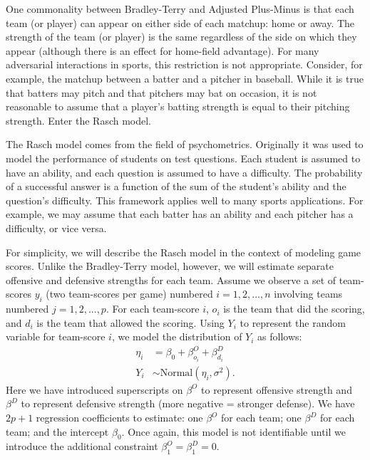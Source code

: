 \documentclass{article}
\begin{document}
  One commonality between Bradley-Terry and Adjusted Plus-Minus is that each team (or player) can appear on either side of each matchup: home or away. The strength of the team (or player) is the same regardless of the side on which they appear (although there is an effect for home-field advantage). For many adversarial interactions in sports, this restriction is not appropriate. Consider, for example, the matchup between a batter and a pitcher in baseball. While it is true that batters may pitch and that pitchers may bat on occasion, it is not reasonable to assume that a player's batting strength is equal to their pitching strength. Enter the Rasch model.

  The Rasch model comes from the field of psychometrics. Originally it was used to model the performance of students on test questions. Each student is assumed to have an ability, and each question is assumed to have a difficulty. The probability of a successful answer is a function of the sum of the student's ability and the question's difficulty. This framework applies well to many sports applications. For example, we may assume that each batter has an ability and each pitcher has a difficulty, or vice versa.

  For simplicity, we will describe the Rasch model in the context of modeling game scores. Unlike the Bradley-Terry model, however, we will estimate separate offensive and defensive strengths for each team. Assume we observe a set of team-scores $y_i$ (two team-scores per game) numbered $i = 1, 2, ..., n$ involving teams numbered $j = 1, 2, ..., p$. For each team-score $i$, $o_i$ is the team that did the scoring, and $d_i$ is the team that allowed the scoring. Using $Y_i$ to represent the random variable for team-score $i$, we model the distribution of $Y_i$ as follows:
  \begin{equation*}
    \begin{split}
      \eta_{i} &= \beta_0 + \beta^O_{o_i} + \beta^D_{d_i}\\
      Y_i &\sim \mbox{Normal}(\eta_i, \sigma^2).
    \end{split}
  \end{equation*}
  Here we have introduced superscripts on $\beta^O$ to represent offensive strength and $\beta^D$ to represent defensive strength (more negative = stronger defense). We have $2p + 1$ regression coefficients to estimate: one $\beta^O$ for each team; one $\beta^D$ for each team; and the intercept $\beta_0$. Once again, this model is not identifiable until we introduce the additional constraint $\beta^O_1 = \beta^D_1 = 0$.
  
\end{document}
